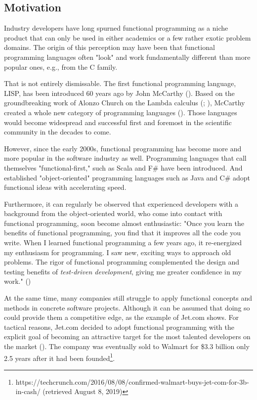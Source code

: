 \subsection{Motivation}

Industry developers have long spurned functional programming as a niche product that can only be used in either academics or a few rather exotic problem domains. The origin of this perception may have been that functional programming languages often "look" and work fundamentally different than more popular ones, e.g., from the C family.

That is not entirely dismissable. The first functional programming language, LISP, has been introduced 60 years ago by John McCarthy  (\cite{mccarthy_recursive_1959}). Based on the groundbreaking work of Alonzo Church on the Lambda calculus (\cite{church_properties_1936}; \cite{church_calculi_1941}), McCarthy created a whole new category of programming languages (\cite{turner_history_2012}). Those languages would become widespread and successful first and foremost in the scientific community in the decades to come.

However, since the early 2000s, functional programming has become more and more popular in the software industry as well. Programming languages that call themselves "functional-first," such as Scala and F\# have been introduced. And established "object-oriented" programming languages such as Java and C\# adopt functional ideas with accelerating speed.

Furthermore, it can regularly be observed that experienced developers with a background from the object-oriented world, who come into contact with functional programming, soon become almost enthusiastic: "Once you learn the benefits of functional programming, you find that it improves all the code you write. When I learned functional programming a few years ago, it re-energized my enthusiasm for programming. I saw new, exciting ways to approach old problems. The rigor of functional programming complemented the design and testing benefits of \textit{test-driven development}, giving me greater confidence in my work." (\cite[vii]{wampler_functional_2011})

At the same time, many companies still struggle to apply functional concepts and methods in concrete software projects. Although it can be assumed that doing so could provide them a competitive edge, as the example of Jet.com shows. For tactical reasons, Jet.com decided to adopt functional programming with the explicit goal of becoming an attractive target for the most talented developers on the market (\cite{han_how_2015}). The company was eventually sold to Walmart for \$3.3 billion only 2.5 years after it had been founded\footnote{https://techcrunch.com/2016/08/08/confirmed-walmart-buys-jet-com-for-3b-in-cash/ (retrieved August 8, 2019)}. 

